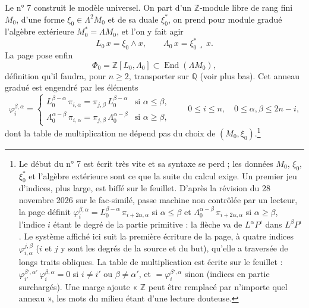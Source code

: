 \documentclass[11pt,a4paper]{article}
\begin{document}
Le n° 7 construit le modèle universel. On part d'un $\mathbb{Z}$-module libre
de rang fini $M_{0}$, d'une forme $\xi_{0} \in \Lambda^{2}M_{0}$ et de sa duale
$\xi_{0}^{*}$, on prend pour module gradué l'algèbre extérieure
$M_{0}^{*} = \Lambda M_{0}$, et l'on y fait agir
\[
L_{0}\,x = \xi_{0} \wedge x,
\qquad
\Lambda_{0}\,x = \xi_{0}^{*} \lrcorner\, x .
\]
La page pose enfin
\[
\Phi_{0} = \mathbb{Z}[L_{0}, \Lambda_{0}] \subset \operatorname{End}(\Lambda M_{0}) ,
\]
définition qu'il faudra, pour $n \geqslant 2$, transporter sur $\mathbb{Q}$ (voir
plus bas).
Cet anneau gradué est engendré par les éléments
\[
\varphi^{\beta,\alpha}_{i} =
\begin{cases}
L_{0}^{\beta-\alpha}\,\pi_{i,\alpha} = \pi_{j,\beta}\,L_{0}^{\beta-\alpha}
 & \text{si } \alpha \leqslant \beta, \\[2pt]
\Lambda_{0}^{\alpha-\beta}\,\pi_{i,\alpha} = \pi_{j,\beta}\,\Lambda_{0}^{\alpha-\beta}
 & \text{si } \alpha \geqslant \beta,
\end{cases}
\qquad 0 \leqslant i \leqslant n, \quad 0 \leqslant \alpha, \beta \leqslant 2n-i,
\]
dont la table de multiplication ne dépend pas du choix de
$(M_{0}, \xi_{0})$.\footnote{Le début du n° 7 est écrit très vite et sa syntaxe
se perd ; les données $M_{0}$, $\xi_{0}$, $\xi_{0}^{*}$ et l'algèbre extérieure
sont ce que la suite du calcul exige. Un premier jeu d'indices, plus large, est
biffé sur le feuillet. D'après la révision du 28 novembre 2026 sur le fac-similé, passe machine non contrôlée par un lecteur, la page définit
$\varphi^{\beta,\alpha}_{i} = L_{0}^{\beta-\alpha}\,\pi_{i+2\alpha,\alpha}$ si
$\alpha \leqslant \beta$ et $\Lambda_{0}^{\alpha-\beta}\,\pi_{i+2\alpha,\alpha}$
si $\alpha \geqslant \beta$, l'indice $i$ étant le degré de la partie primitive :
la flèche va de $L^{\alpha}P^{i}$ dans $L^{\beta}P^{i}$. Le système affiché ici
suit la première écriture de la page, à quatre indices
$\varphi^{j,\beta}_{i,\alpha}$ ($i$ et $j$ y sont les degrés de la source et du
but), qu'elle a traversée de longs traits obliques. La table de
multiplication est écrite sur le feuillet :
$\varphi^{\beta',\alpha'}_{i'}\,\varphi^{\beta,\alpha}_{i} = 0$ si $i \neq i'$ ou
$\beta \neq \alpha'$, et $= \varphi^{\beta',\alpha}_{i}$ sinon (indices en partie
surchargés). Une marge ajoute « $\mathbb{Z}$ peut être remplacé par n'importe
quel anneau », les mots du milieu étant d'une lecture douteuse.}
\end{document}
